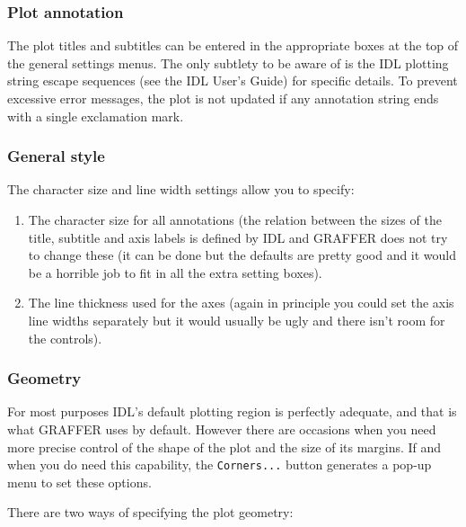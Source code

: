 \documentclass[11pt,twoside,english]{article}
\begin{document}
\subsubsection{Plot annotation}

The plot titles and subtitles can be entered in the appropriate boxes
at the top of the general settings menus. The only subtlety to be aware
of is the IDL plotting string escape sequences (see the IDL User's
Guide) for specific details. To prevent excessive error messages, the
plot is not updated if any annotation string ends with a single
exclamation mark.


\subsubsection{General style}

The character size and line width settings allow you to specify:

\begin{enumerate}
\item The character size for all annotations (the relation between the
  sizes of the title, subtitle and axis labels is defined by IDL and
  GRAFFER does not try to change these (it can be done but the defaults
  are pretty good and it would be a horrible job to fit in all the
  extra setting boxes).
\item The line thickness used for the axes (again in principle you
  could set the axis line widths separately but it would usually be
  ugly and there isn't room for the controls).
\end{enumerate}

\subsubsection{Geometry}

For most purposes IDL's default plotting region is perfectly adequate,
and that is what GRAFFER uses by default. However there are occasions
when you need more precise control of the shape of the plot and the
size of its margins. If and when you do need this capability, the
\texttt{Corners...} button generates a pop-up menu to set these
options.

There are two ways of specifying the plot geometry:
\end{document}
